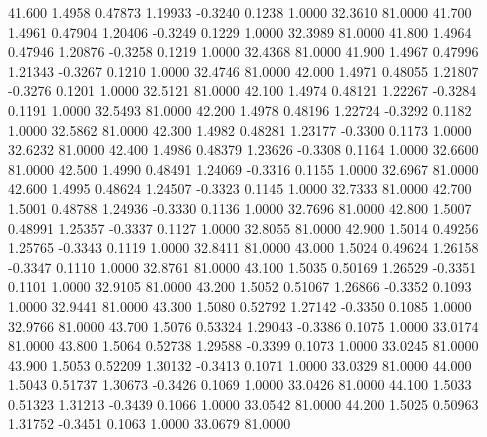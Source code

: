   41.600   1.4958   0.47873   1.19933  -0.3240   0.1238   1.0000  32.3610  81.0000
  41.700   1.4961   0.47904   1.20406  -0.3249   0.1229   1.0000  32.3989  81.0000
  41.800   1.4964   0.47946   1.20876  -0.3258   0.1219   1.0000  32.4368  81.0000
  41.900   1.4967   0.47996   1.21343  -0.3267   0.1210   1.0000  32.4746  81.0000
  42.000   1.4971   0.48055   1.21807  -0.3276   0.1201   1.0000  32.5121  81.0000
  42.100   1.4974   0.48121   1.22267  -0.3284   0.1191   1.0000  32.5493  81.0000
  42.200   1.4978   0.48196   1.22724  -0.3292   0.1182   1.0000  32.5862  81.0000
  42.300   1.4982   0.48281   1.23177  -0.3300   0.1173   1.0000  32.6232  81.0000
  42.400   1.4986   0.48379   1.23626  -0.3308   0.1164   1.0000  32.6600  81.0000
  42.500   1.4990   0.48491   1.24069  -0.3316   0.1155   1.0000  32.6967  81.0000
  42.600   1.4995   0.48624   1.24507  -0.3323   0.1145   1.0000  32.7333  81.0000
  42.700   1.5001   0.48788   1.24936  -0.3330   0.1136   1.0000  32.7696  81.0000
  42.800   1.5007   0.48991   1.25357  -0.3337   0.1127   1.0000  32.8055  81.0000
  42.900   1.5014   0.49256   1.25765  -0.3343   0.1119   1.0000  32.8411  81.0000
  43.000   1.5024   0.49624   1.26158  -0.3347   0.1110   1.0000  32.8761  81.0000
  43.100   1.5035   0.50169   1.26529  -0.3351   0.1101   1.0000  32.9105  81.0000
  43.200   1.5052   0.51067   1.26866  -0.3352   0.1093   1.0000  32.9441  81.0000
  43.300   1.5080   0.52792   1.27142  -0.3350   0.1085   1.0000  32.9766  81.0000
  43.700   1.5076   0.53324   1.29043  -0.3386   0.1075   1.0000  33.0174  81.0000
  43.800   1.5064   0.52738   1.29588  -0.3399   0.1073   1.0000  33.0245  81.0000
  43.900   1.5053   0.52209   1.30132  -0.3413   0.1071   1.0000  33.0329  81.0000
  44.000   1.5043   0.51737   1.30673  -0.3426   0.1069   1.0000  33.0426  81.0000
  44.100   1.5033   0.51323   1.31213  -0.3439   0.1066   1.0000  33.0542  81.0000
  44.200   1.5025   0.50963   1.31752  -0.3451   0.1063   1.0000  33.0679  81.0000
